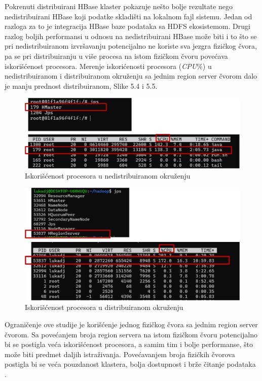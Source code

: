 \documentclass[12pt,oneside]{memoir}
\begin{document}
Pokrenuti distribuirani HBase klaster pokazuje nešto bolje rezultate nego nedistribuirani HBase koji podatke skladišti na lokalnom fajl sistemu. Jedan od razloga za to je integracija HBase baze podataka sa HDFS ekosistemom\cite{hbaseGuide}.  Drugi razlog boljih performansi u odnosu na nedistribuirani HBase može biti i to što se pri nedistribuiranom izvršavanju potencijalno ne koriste sva jezgra fizičkog čvora, pa se pri distribuiranju u više procesa na istom fizičkom čvoru povećava iskorišćenost procesora. Merenje iskorićenosti procesora (\textit{CPU}\%) u nedistribuiranom i distribuiranom okruženju sa jednim region server čvorom dalo je manju prednost distribuiranom, Slike 5.4 i 5.5. 

\begin{figure}[!ht]
  \centering
  \includegraphics[width=1\textwidth]{nedistribuiro-cpu.png}
  \caption{Iskorišćenost procesora u nedistribuiranom okruženju}
  \label{fig:grafikon}
\end{figure}


\begin{figure}[!ht]
  \centering
  \includegraphics[width=1\textwidth]{distribuirano-cpu.png}
  \caption{Iskorišćenost procesora u distribuiranom okruženju}
  \label{fig:grafikon}
\end{figure}

\pagebreak 
Ograničenje ove studije je korišćenje jednog fizičkog čvora sa jednim region server čvorom. Sa povećanjem broja region servera na istom fizičkom čvoru potencijalno bi se postigla veća iskorišćenost procesora, a samim tim i bolje performanse, što može biti predmet daljih istraživanja. Povećavanjem broja fizičkih čvorova postigla bi se veća pouzdanost klastera, bolja dostupnost i brže čitanje podataka \cite{ColumnarOriented}.  
\end{document}
